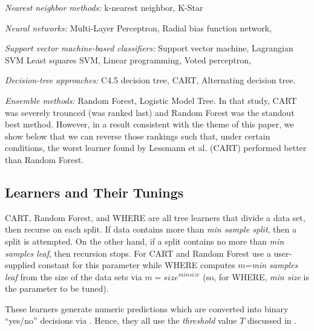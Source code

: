\item
{\em Nearest neighbor methods:}
k-nearest neighbor,
K-Star

\item
{\em Neural networks:}
Multi-Layer Perceptron,
Radial bias function network,

\item
{\em Support vector machine-based classifiers:}
Support vector machine,
Lagrangian SVM
Least squares SVM,
Linear programming,
Voted perceptron,

\item
{\em Decision-tree approaches:}
C4.5 decision tree,
CART,
Alternating decision tree.
\item
{\em Ensemble methods:}
Random Forest,
Logistic Model Tree.
\ei
In that study, CART was severely trounced (was ranked last) and Random Forest was
the standout best method. However, in a result consistent with the theme of this paper,
we show below that we can reverse those rankings such that, under certain conditions,
  the worst learner found by Lessmann et al. (CART) performed better
than Random Forest.
  

\subsection{Learners and Their Tunings}

CART, Random Forest, and WHERE are all  tree learners that divide a data set, then recurse
on each split.
If data contains more than {\em min sample split}, then a split is attempted.
On the other hand, if a split contains no more than {\em min samples leaf}, then recursion stops. For CART and Random Forest use a 
user-supplied constant for this parameter while
WHERE computes $m$={\em min samples leaf} from the size of the data
sets via  $m=\mathit{size}^\mathit{min size}$ (so, for WHERE,
{\em min size} is the parameter to be tuned).

These learners
generate numeric predictions which are converted
into binary ``yes/no'' decisions via . Hence, they all use the {\em threshold} value $T$ discussed in .

